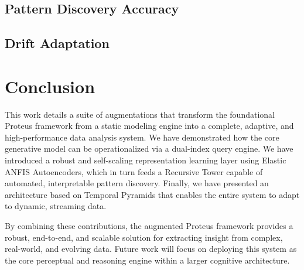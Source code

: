 \documentclass{article}
\begin{document}
\subsection{Pattern Discovery Accuracy}

\subsection{Drift Adaptation}

\section{Conclusion}

This work details a suite of augmentations that transform the foundational Proteus framework from a static modeling engine into a complete, adaptive, and high-performance data analysis system. We have demonstrated how the core generative model can be operationalized via a dual-index query engine. We have introduced a robust and self-scaling representation learning layer using Elastic ANFIS Autoencoders, which in turn feeds a Recursive Tower capable of automated, interpretable pattern discovery. Finally, we have presented an architecture based on Temporal Pyramids that enables the entire system to adapt to dynamic, streaming data.

By combining these contributions, the augmented Proteus framework provides a robust, end-to-end, and scalable solution for extracting insight from complex, real-world, and evolving data. Future work will focus on deploying this system as the core perceptual and reasoning engine within a larger cognitive architecture.



\end{document}
